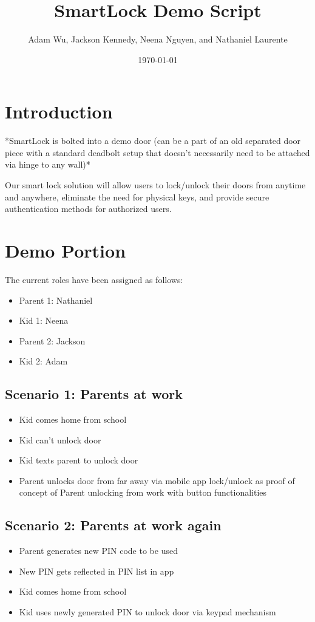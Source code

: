 \documentclass[12pt]{article}
\title{ SmartLock Demo Script }
\author{ Adam Wu, Jackson Kennedy, Neena Nguyen, and Nathaniel Laurente }
\date{\today}
\begin{document}
\maketitle

\section{Introduction}

*SmartLock is bolted into a demo door (can be a part of an old separated door piece with a standard deadbolt setup that doesn’t necessarily need to be attached via hinge to any wall)*

Our smart lock solution will allow users to lock/unlock their doors from anytime and anywhere, eliminate the need for physical keys, and provide secure authentication methods for authorized users.

\section{Demo Portion}
The current roles have been assigned as follows:
\begin{itemize}
    \item Parent 1: Nathaniel
    \item Kid 1: Neena
    \item Parent 2: Jackson
    \item Kid 2: Adam
\end{itemize}

\subsection{Scenario 1: Parents at work}
\begin{itemize}
    \item Kid comes home from school
    \item Kid can't unlock door
    \item Kid texts parent to unlock door
    \item Parent unlocks door from far away via mobile app lock/unlock as proof of concept of Parent unlocking from work with button functionalities
\end{itemize}

\subsection{Scenario 2: Parents at work again}
\begin{itemize}
    \item Parent generates new PIN code to be used
    \item New PIN gets reflected in PIN list in app
    \item Kid comes home from school
    \item Kid uses newly generated PIN to unlock door via keypad mechanism
\end{itemize}
\end{document}
